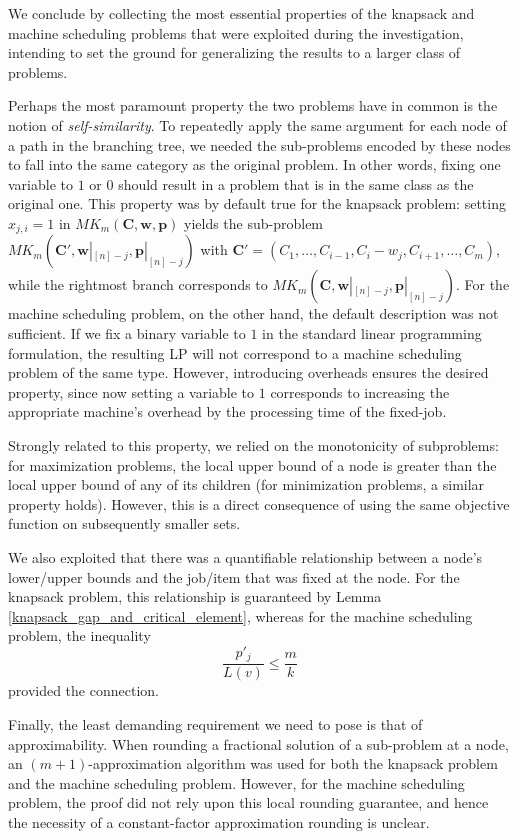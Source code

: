 \documentclass[a4paper,UKenglish,cleveref, autoref, thm-restate, pdfa]{lipics-v2021}
\theoremstyle{plain}
\begin{document}
We conclude by collecting the most essential properties of the knapsack and machine scheduling problems that were exploited during the investigation, intending to set the ground for generalizing the results to a larger class of problems. 

Perhaps the most paramount property the two problems have in common is the notion of \emph{self-similarity}. To repeatedly apply the same argument for each node of a path in the branching tree, we needed the sub-problems encoded by these nodes to fall into the same category as the original problem. In other words, fixing one variable to $1$ or $0$ should result in a problem that is in the same class as the original one. This property was by default true for the knapsack problem: setting $x_{j, i} = 1$ in $MK_m(\bm{C}, \bm{w}, \bm{p})$ yields the sub-problem $MK_m(\bm{C'}, \bm{w}|_{[n]-j}, \bm{p}|_{[n]-j})$ with $\bm{C'} = (C_1, \ldots, C_{i-1}, C_i - w_j, C_{i+1}, \ldots, C_m)$, while the rightmost branch corresponds to $MK_m(\bm{C}, \bm{w}|_{[n]-j}, \bm{p}|_{[n]-j})$. For the machine scheduling problem, on the other hand, the default description was not sufficient. If we fix a binary variable to $1$ in the standard linear programming formulation, the resulting LP will not correspond to a machine scheduling problem of the same type. However, introducing overheads ensures the desired property, since now setting a variable to $1$ corresponds to increasing the appropriate machine's overhead by the processing time of the fixed-job.

Strongly related to this property, we relied on the monotonicity of subproblems: for maximization problems, the local upper bound of a node is greater than the local upper bound of any of its children (for minimization problems, a similar property holds). However, this is a direct consequence of using the same objective function on subsequently smaller sets.

We also exploited that there was a quantifiable relationship between a node's lower/upper bounds and the job/item that was fixed at the node. For the knapsack problem, this relationship is guaranteed by Lemma \ref{knapsack_gap_and_critical_element}, whereas for the machine scheduling problem, the inequality
\[
\frac{p'_j}{L(v)} \le \frac{m}{k}
\]
provided the connection.

Finally, the least demanding requirement we need to pose is that of approximability. When rounding a fractional solution of a sub-problem at a node, an $(m+1)$-approximation algorithm was used for both the knapsack problem and the machine scheduling problem. However, for the machine scheduling problem, the proof did not rely upon this local rounding guarantee, and hence the necessity of a constant-factor approximation rounding is unclear.
\end{document}
